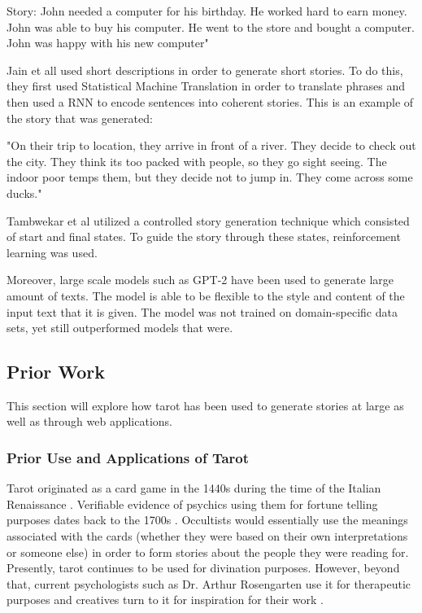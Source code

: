 \documentclass[10pt,twocolumn]{article}
\begin{document}
Story: John needed a computer for his birthday. He worked hard to earn money. John was able to buy his
computer. He went to the store and bought a computer. John was happy with his new computer"

Jain et all \cite{jain_agrawal_mishra_sukhwani_laha_sankaranarayanan_2017} used short descriptions in order to generate short stories. To do this, they first used Statistical Machine Translation in order to translate phrases and then used a RNN to encode sentences into coherent stories. This is an example of the story that was generated:

"On their trip to location, they arrive in front of a river. They decide to check out the city. They think its too packed with people, so they go sight seeing. The indoor poor temps them, but they decide not to jump in. They come across some ducks."

Tambwekar et al\cite{tambwekar_dhuliawala_martin_mehta_harrison_riedl_2019} utilized  a controlled story generation technique which consisted of start and final states. To guide the story through these states, reinforcement learning was used.

Moreover, large scale models such as GPT-2\cite{tambwekar_dhuliawala_martin_mehta_harrison_riedl_2019} have been used to generate large amount of texts. The model is able to be flexible to the style and content of the input text that it is given. The model was not trained on domain-specific data sets, yet still outperformed models that were.


\subsection{Prior Work}
This section will explore how tarot has been used to generate stories at large as well as through web applications. 

\subsubsection{Prior Use and Applications of Tarot}
    Tarot originated as a card game in the 1440s during the time of the Italian Renaissance . Verifiable evidence of psychics using them for fortune telling purposes dates back to the 1700s \cite{wen2015holistic}. Occultists would essentially use the meanings associated with the cards (whether they were based on their own interpretations or someone else) in order to form stories about the people they were reading for. Presently, tarot continues to be used for divination purposes. However, beyond that, current psychologists such as Dr. Arthur Rosengarten use it for therapeutic purposes \cite{chaliceL} and creatives turn to it for inspiration for their work \cite{gypsy_2021}.
\end{document}
